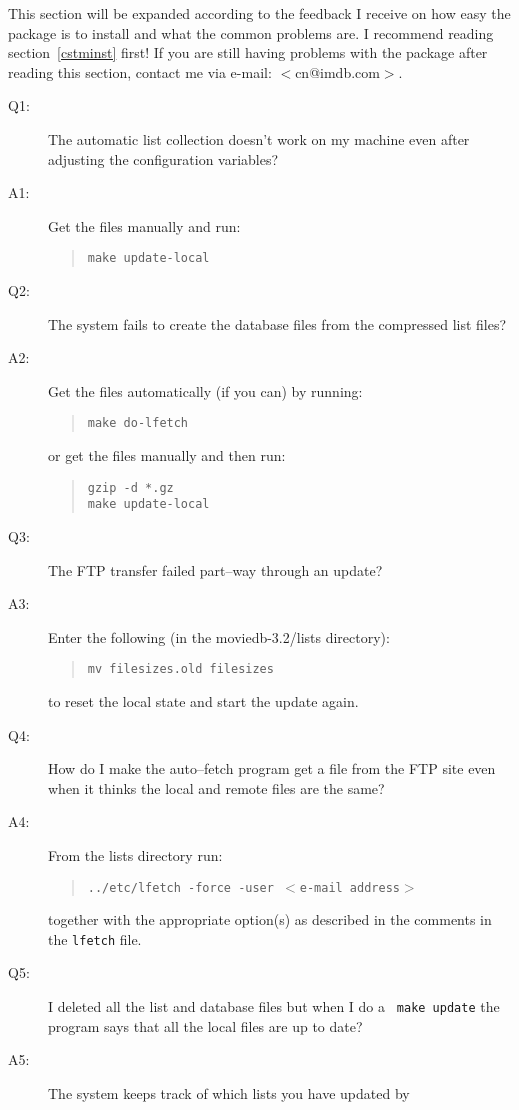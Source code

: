 This section will be expanded according to the feedback I receive on how
easy the package is to install and what the common problems are. I 
recommend
reading section~\ref{cstminst} first! If you are still having problems 
with the package after reading this section, contact me via e-mail: 
$<$cn@imdb.com$>$.

\begin{description}
\item[Q1:] The automatic list collection doesn't work on my machine even 
after
     adjusting the configuration variables?
\item[A1:] Get the files manually and run:
\begin{quote}
{\tt make update-local}
\end{quote}
\item[Q2:] The system fails to create the database files from the 
compressed list
     files?
\item[A2:] Get the files automatically (if you can) by running:
\begin{quote}
{\tt make do-lfetch}
\end{quote}
or get the files manually and then run:
\begin{quote}
{\tt gzip -d *.gz}\\
{\tt make update-local}
\end{quote}
\item[Q3:] The FTP transfer failed part--way through an update?
\item[A3:] Enter the following (in the moviedb-3.2/lists directory):
\begin{quote}
{\tt mv filesizes.old filesizes}
\end{quote}
to reset the local state and start the update again.
\item[Q4:] How do I make the auto--fetch program get a file from the FTP 
site even
     when it thinks the local and remote files are the same?
\item[A4:] From the lists directory run: 
\begin{quote}
{\tt ../etc/lfetch -force -user $<$e-mail address$>$}
\end{quote}
together with the appropriate option(s) as described in the comments in
the {\tt lfetch} file.
\item[Q5:] I deleted all the list and database files but when I do a {\tt 
make 
update} the program says that all the local files are up to date?
\item[A5:] The system keeps track of which lists you have updated by 

\end{description}
